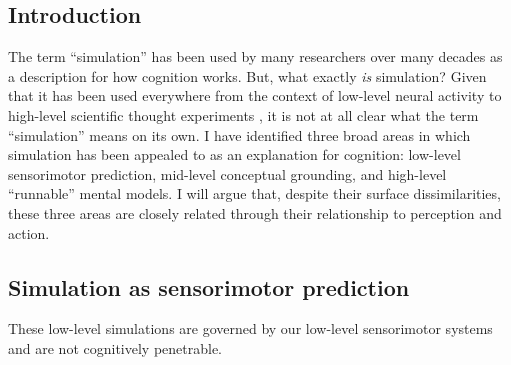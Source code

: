 \documentclass[12pt]{article}
\begin{document}

\subsection*{Introduction}

The term ``simulation'' has been used by many researchers over many decades as a description for how cognition works. But, what exactly \textit{is} simulation? Given that it has been used everywhere from the context of low-level neural activity \citep{Gallese1998} to high-level scientific thought experiments \citep{Gendler1998}, it is not at all clear what the term ``simulation'' means on its own. I have identified three broad areas in which simulation has been appealed to as an explanation for cognition: low-level sensorimotor prediction, mid-level conceptual grounding, and high-level ``runnable'' mental models. I will argue that, despite their surface dissimilarities, these three areas are closely related through their relationship to perception and action.

\subsection*{Simulation as sensorimotor prediction}

These low-level simulations are governed by our low-level sensorimotor systems and are not cognitively penetrable.
\end{document}
